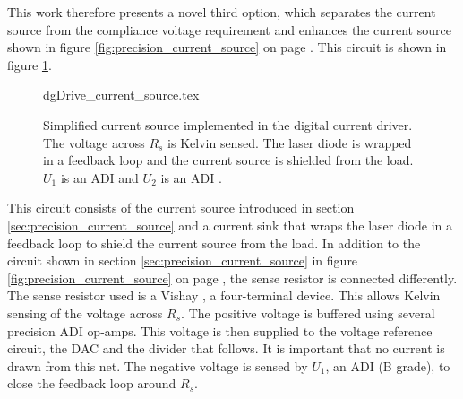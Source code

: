 This work therefore presents a novel third option, which separates the current source from the compliance voltage requirement and enhances the current source shown in figure \ref{fig:precision_current_source} on page \pageref{fig:precision_current_source}. This circuit is shown in figure \ref{fig:dgDrive_current_source}.
\begin{figure}[ht]
    \centering
        {dgDrive_current_source.tex}
    \caption{Simplified current source implemented in the digital current driver. The voltage across $R_s$ is Kelvin sensed. The laser diode is wrapped in a feedback loop and the current source is shielded from the load. $U_1$ is an ADI  and $U_2$ is an ADI .}
    \label{fig:dgDrive_current_source}
\end{figure}

This circuit consists of the current source introduced in section \ref{sec:precision_current_source} and a current sink that wraps the laser diode in a feedback loop to shield the current source from the load. In addition to the circuit shown in section \ref{sec:precision_current_source} in figure \ref{fig:precision_current_source} on page \pageref{fig:precision_current_source}, the sense resistor is connected differently. The sense resistor used is a Vishay  \cite{datasheet_VPR}, a four-terminal device. This allows Kelvin sensing of the voltage across $R_s$. The positive voltage is buffered using several precision ADI  \cite{datasheet_ADA4077} op-amps. This voltage is then supplied to the voltage reference circuit, the DAC and the divider that follows. It is important that no current is drawn from this net. The negative voltage is sensed by $U_1$, an ADI  (B grade), to close the feedback loop around $R_s$.

